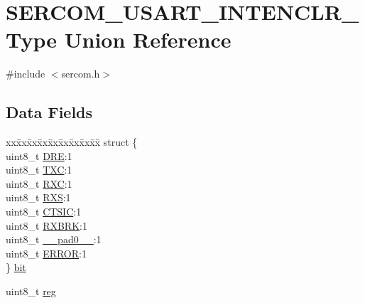 \hypertarget{union_s_e_r_c_o_m___u_s_a_r_t___i_n_t_e_n_c_l_r___type}{}\section{S\+E\+R\+C\+O\+M\+\_\+\+U\+S\+A\+R\+T\+\_\+\+I\+N\+T\+E\+N\+C\+L\+R\+\_\+\+Type Union Reference}
\label{union_s_e_r_c_o_m___u_s_a_r_t___i_n_t_e_n_c_l_r___type}


{\ttfamily \#include $<$sercom.\+h$>$}

\subsection*{Data Fields}
\begin{DoxyCompactItemize}
\item 
\begin{tabbing}
xx\=xx\=xx\=xx\=xx\=xx\=xx\=xx\=xx\=\kill
struct \{\\
\>uint8\_t \mbox{\hyperlink{union_s_e_r_c_o_m___u_s_a_r_t___i_n_t_e_n_c_l_r___type_a5e4bea925be1d5304d58110ecc60f14e}{DRE}}:1\\
\>uint8\_t \mbox{\hyperlink{union_s_e_r_c_o_m___u_s_a_r_t___i_n_t_e_n_c_l_r___type_a8f012b40a2f5cf52b14d448b314b5cec}{TXC}}:1\\
\>uint8\_t \mbox{\hyperlink{union_s_e_r_c_o_m___u_s_a_r_t___i_n_t_e_n_c_l_r___type_ad465929f0a73cbdc2d5ab6b210909039}{RXC}}:1\\
\>uint8\_t \mbox{\hyperlink{union_s_e_r_c_o_m___u_s_a_r_t___i_n_t_e_n_c_l_r___type_ab54b6e9387289f3bbffba2ad5b5fd646}{RXS}}:1\\
\>uint8\_t \mbox{\hyperlink{union_s_e_r_c_o_m___u_s_a_r_t___i_n_t_e_n_c_l_r___type_a63fbe80d72a96677df0d6251a87c413a}{CTSIC}}:1\\
\>uint8\_t \mbox{\hyperlink{union_s_e_r_c_o_m___u_s_a_r_t___i_n_t_e_n_c_l_r___type_a12194247ef8f371df5b8b093552a5a0c}{RXBRK}}:1\\
\>uint8\_t \mbox{\hyperlink{union_s_e_r_c_o_m___u_s_a_r_t___i_n_t_e_n_c_l_r___type_a8b4eebe79ded0459acec2f4950102ba3}{\_\_pad0\_\_}}:1\\
\>uint8\_t \mbox{\hyperlink{union_s_e_r_c_o_m___u_s_a_r_t___i_n_t_e_n_c_l_r___type_a4be51829c8720b7d159b77c39924afaa}{ERROR}}:1\\
\} \mbox{\hyperlink{union_s_e_r_c_o_m___u_s_a_r_t___i_n_t_e_n_c_l_r___type_ac3d6437d1765de202964fdd2b3993f6d}{bit}}\\

\end{tabbing}\item 
uint8\+\_\+t \mbox{\hyperlink{union_s_e_r_c_o_m___u_s_a_r_t___i_n_t_e_n_c_l_r___type_a9428adc9af4653a2050e2536b55dec8d}{reg}}
\end{DoxyCompactItemize}


